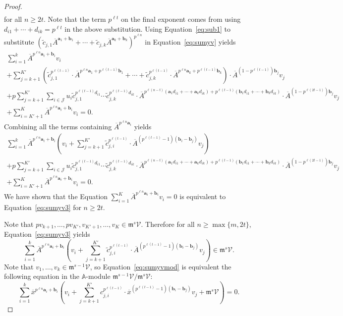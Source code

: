 \documentclass[10pt,a4paper]{amsart}
\newcommand{\A}{\mathbb{A}}
\newcommand{\ba}{\boldsymbol{a}}
\newcommand{\bb}{\boldsymbol{b}}
\newcommand{\frm}{\mathfrak{m}}
\newcommand{\mJ}{\mathcal{J}}
\newcommand{\mV}{\mathcal{V}}
\newcommand{\oA}{\overline{A}}
\newcommand{\ox}{\overline{x}}
\newcommand{\tc}{\widetilde{c}}
\begin{document}
\begin{proof}
\begin{multline}
    \end{multline}
    for all $n \geq 2t$.
    Note that the term $p^{\ell t}$ on the final exponent comes from using $d_{i1} + \cdots + d_{ik} = p^{\ell t}$ in the above substitution.
    Using Equation~\eqref{eq:sub1} to substitute $\left(\tc_{j,1} \oA^{\ba_1 + \bb_1} + \cdots + \tc_{j,k} \oA^{\ba_k + \bb_k}\right)^{p^{\ell n}}$ in Equation~\eqref{eq:sumyv} yields
    \begin{multline}\label{eq:sumyv2}
        \sum_{i = 1}^k \oA^{p^{\ell n} \ba_i + \bb_i} v_i \\
        + \sum_{j = k+1}^{K'} \left(\tc_{j,1}^{p^{\ell (t-1)}} \cdot \oA^{p^{\ell n}\ba_1 + p^{\ell (t-1)} \bb_1} + \cdots + \tc_{j,k}^{p^{\ell (t-1)}} \cdot \oA^{p^{\ell n}\ba_k + p^{\ell (t-1)} \bb_k} \right) \cdot \oA^{(1 - p^{\ell (t-1)}) \bb_j} v_j \\
        + p \sum_{j = k+1}^{K'} \sum_{i \in \mJ} u_{i} \tc_{j,1}^{p^{\ell (t-1)}d_{i1}} \cdots \tc_{j,k}^{p^{\ell (t-1)} d_{ik}} \cdot \oA^{p^{\ell (n-t)}(\ba_1 d_{i1} + \cdots + \ba_k d_{ik}) + p^{\ell (t-1)} (\bb_1 d_{i1} + \cdots + \bb_k d_{ik})} \cdot \oA^{(1 - p^{\ell (2t-1)}) \bb_j} v_j \\
        + \sum_{i = K'+1}^K \oA^{p^{\ell n} \ba_i + \bb_i} v_i = 0.
    \end{multline}
    Combining all the terms containing $\oA^{p^{\ell n} \ba_i}$ yields
    \begin{multline}\label{eq:sumyv3}
        \sum_{i = 1}^k \oA^{p^{\ell n} \ba_i + \bb_i} \left(v_i + \sum_{j = k+1}^{K'} \tc_{j,i}^{p^{\ell (t-1)}} \cdot \oA^{(p^{\ell (t-1)} - 1) (\bb_i - \bb_j)} v_j \right) \\
        + p \sum_{j = k+1}^{K'} \sum_{i \in \mJ} u_{i} \tc_{j,1}^{p^{\ell (t-1)}d_{i1}} \cdots \tc_{j,k}^{p^{\ell (t-1)} d_{ik}} \cdot \oA^{p^{\ell (n-t)}(\ba_1 d_{i1} + \cdots + \ba_k d_{ik}) + p^{\ell (t-1)} (\bb_1 d_{i1} + \cdots + \bb_k d_{ik})} \cdot \oA^{(1 - p^{\ell (2t-1)}) \bb_j} v_j \\
        + \sum_{i = K'+1}^K \oA^{p^{\ell n} \ba_i + \bb_i} v_i = 0.
    \end{multline}
    We have shown that the Equation $\sum_{i = 1}^K \oA^{p^{\ell n} \ba_i + \bb_i} v_i = 0$ is equivalent to Equation~\eqref{eq:sumyv3} for $n \geq 2t$.
    
    Note that $p v_{k+1}, \ldots, p v_{K'}, v_{K'+1}, \ldots, v_K \in \frm^s \mV$.
    Therefore for all $n \geq \max\{m, 2t\}$, Equation~\eqref{eq:sumyv3} yields
    \begin{equation}\label{eq:sumyvmod}
    \sum_{i = 1}^k \oA^{p^{\ell n} \ba_i + \bb_i} \left(v_i + \sum_{j = k+1}^{K'} \tc_{j,i}^{p^{\ell (t-1)}} \cdot \oA^{(p^{\ell (t-1)} - 1) (\bb_i - \bb_j)} v_j \right) \in \frm^s \mV.
    \end{equation}
    Note that $v_1, \ldots, v_k \in \frm^{s-1} \mV$, so Equation~\eqref{eq:sumyvmod} is equivalent the following equation in the $\A$-module $\frm^{s-1} \mV/\frm^s\mV$:
    \[
    \sum_{i = 1}^k \ox^{p^{\ell n} \ba_i + \bb_i} \left(v_i + \sum_{j = k+1}^{K'} c_{j,i}^{p^{\ell (t-1)}} \cdot \ox^{(p^{\ell (t-1)} - 1) (\bb_i - \bb_j)} v_j + \frm^s\mV \right) = 0.
    \]


\end{proof}
\end{document}
